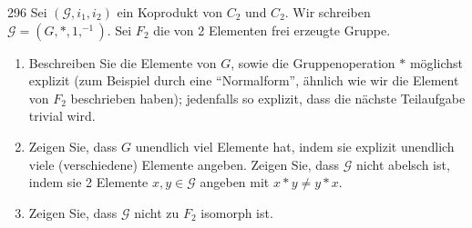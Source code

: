 \begin{algebraUE}{296}
Sei $(\mathcal{G},i_1,i_2)$ ein Koprodukt von $C_2$ und $C_2$. Wir schreiben
$\mathcal{G} = (G,\ast,1,^{-1})$. Sei $F_2$ die von 2 Elementen frei erzeugte Gruppe.
\begin{enumerate}
  \item Beschreiben Sie die Elemente von $G$, sowie die Gruppenoperation $\ast$
  möglichst explizit (zum Beispiel durch eine ``Normalform'', ähnlich wie wir
  die Element von $F_2$ beschrieben haben); jedenfalls so explizit, dass die
  nächste Teilaufgabe trivial wird.
  \item Zeigen Sie, dass $G$ unendlich viel Elemente hat, indem sie explizit
  unendlich viele (verschiedene) Elemente angeben. Zeigen Sie, dass $\mathcal{G}$
  nicht abelsch ist, indem sie 2 Elemente $x,y \in \mathcal{G}$ angeben mit
  $x \ast y \neq y \ast x$.
  \item Zeigen Sie, dass $\mathcal{G}$ nicht zu $F_2$ isomorph ist.
\end{enumerate}
\end{algebraUE}

